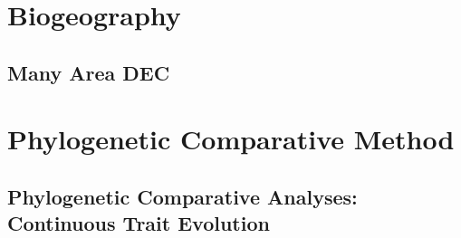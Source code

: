 \documentclass[11pt]{book}
\begin{document}
\part{Biogeography}
\chapter{Many Area DEC}



\part{Phylogenetic Comparative Method}
\chapter{Phylogenetic Comparative Analyses: Continuous Trait Evolution}

\end{document}
